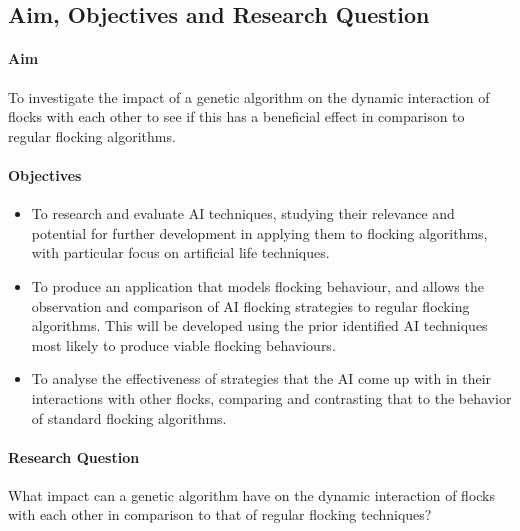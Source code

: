 \subsection{Aim, Objectives and Research Question} 
\paragraph{Aim}To investigate the impact of a genetic algorithm on the dynamic interaction of flocks with each other to see if this has a beneficial effect in comparison to regular flocking algorithms.

\paragraph{Objectives} %
\begin{itemize}
\item %
To research and evaluate AI techniques, studying their relevance and potential for further development in applying them to flocking algorithms, with particular focus on artificial life techniques. 
\item
To produce an application that models flocking behaviour, and allows the observation and comparison of AI flocking strategies to regular flocking algorithms. This will be developed using the prior identified AI techniques most likely to produce viable flocking behaviours. 
\item
To analyse the effectiveness of strategies that the AI come up with in their interactions with other flocks, comparing and contrasting that to the behavior of standard flocking algorithms.
\end{itemize}

\paragraph{Research Question}
What impact can a genetic algorithm have on the dynamic interaction of flocks with each other in comparison to that of regular flocking techniques?


